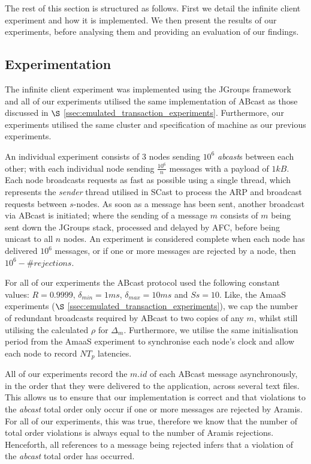     The rest of this section is structured as follows.  First we detail the infinite client experiment and how it is implemented.  We then present the results of our experiments, before analysing them and providing an evaluation of our findings. 
    
    \subsection{Experimentation}\label{ssec: infinite_experimentation}
    The infinite client experiment was implemented using the JGroups framework and all of our experiments utilised the same implementation of \textsf{ABcast} as those discussed in $\S$ \ref{ssec:emulated_transaction_experiments}.  Furthermore, our experiments utilised the same cluster and specification of machine as our previous experiments.  
    
    An individual experiment consists of $3$ nodes sending $10^6$ \emph{abcast}s between each other; with each individual node sending $\frac{10^6}{n}$ messages with a payload of $1kB$.  Each node broadcasts requests as fast as possible using a single thread, which represents the \emph{sender} thread utilised in \textsf{SCast} to process the ARP and broadcast requests between $s$-nodes.  As soon as a message has been sent, another broadcast via \textsf{ABcast} is initiated; where the sending of a message $m$ consists of $m$ being sent down the JGroups stack, processed and delayed by AFC, before being unicast to all $n$ nodes.  An experiment is considered complete when each node has delivered $10^6$ messages, or if one or more messages are rejected by a node, then $10^6 - \#rejections$.  
    
    For all of our experiments the \textsf{ABcast} protocol used the following constant values: $R = 0.9999$, $\delta_{min} = 1ms$, $\delta_{max} = 10ms$ and $Ss = 10$.  Like, the \textsf{AmaaS} experiments ($\S$ \ref{ssec:emulated_transaction_experiments}), we cap the number of redundant broadcasts required by \textsf{ABcast} to two copies of any $m$, whilst still utilising the calculated $\rho$ for $\Delta_m$.  Furthermore, we utilise the same initialisation period from the \textsf{AmaaS} experiment to synchronise each node's clock and allow each node to record $NT_p$ latencies.  
    
    All of our experiments record the $m.id$ of each \textsf{ABcast} message asynchronously, in the order that they were delivered to the application, across several text files.  This allows us to ensure that our implementation is correct and that violations to the \emph{abcast} total order only occur if one or more messages are rejected by \textsf{Aramis}.  For all of our experiments, this was true, therefore we know that the number of total order violations is always equal to the number of \textsf{Aramis} rejections.  Henceforth, all references to a message being rejected infers that a violation of the \emph{abcast} total order has occurred.  
    
